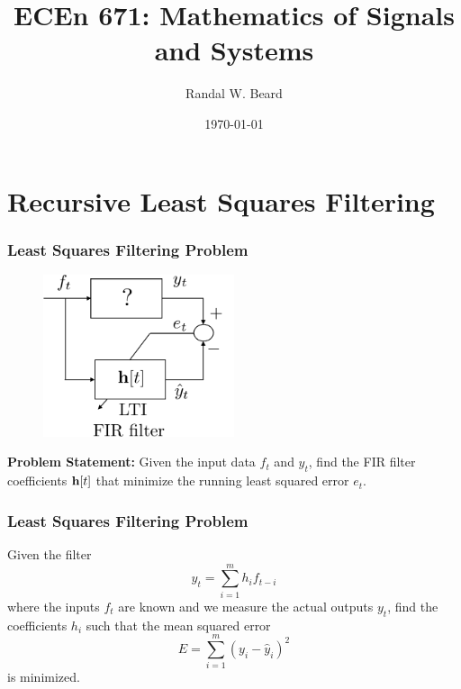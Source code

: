 \documentclass{beamer}
\title{ECEn 671: Mathematics of Signals and Systems}
\author{Randal W. Beard}
\institute{Brigham Young University}
\date{\today}
\begin{document}
\begin{frame}
	\titlepage
\end{frame}


\section{Recursive Least Squares Filtering}
\frame{\sectionpage}

\begin{frame}\frametitle{Least Squares Filtering Problem}
	\begin{figure}
		\includegraphics[width=0.5\textwidth]{figures/chap4_rls}	
	\end{figure}
	
	{\bf Problem Statement:}  Given the input data $f_t$ and $y_t$, find the FIR filter coefficients $\mathbf{h}[t]$ that minimize the running least squared error $e_t$.
	
\end{frame}



\begin{frame}\frametitle{Least Squares Filtering Problem}
	\begin{definition}
		Given the filter
		\[ \hat{y}_t = \sum_{i=1}^m h_i f_{t-i} \]
		where the inputs $f_t$ are known and we measure the actual outputs $y_t$, 
		find the coefficients $h_i$ such that the mean squared error 
		\[
		E = \sum_{i=1}^m \left( y_i-\hat{y}_i \right)^2
		\]
		is minimized.
	\end{definition}
\end{frame}
\end{document}
